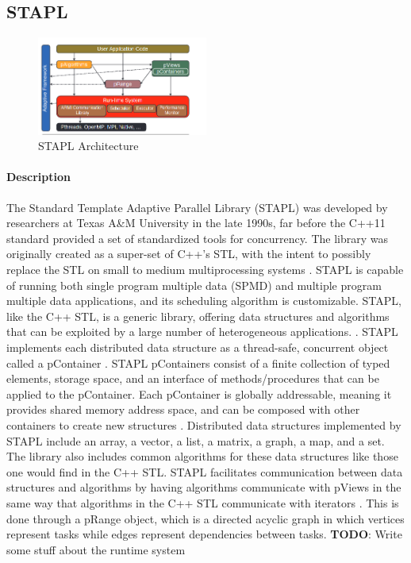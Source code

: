 \subsection{STAPL}
\begin{figure}[h]
\centering
\includegraphics[width=0.5\textwidth]{Figures/stapl_overview.png}
\caption{STAPL Architecture \cite{stapl_parallel_container}}
\label{fig:stapl_arch}
\end{figure}
\paragraph{Description} 
The Standard Template Adaptive Parallel Library (STAPL) was developed by researchers at Texas A\&M University in the late 1990s, far before the C++11 standard provided a set of standardized tools for concurrency. The library was originally created as a super-set of C++'s STL, with the intent to possibly replace the STL on small to medium multiprocessing systems \cite{STAPL}. STAPL is capable of running both single program multiple data (SPMD) and multiple program multiple data applications, and its scheduling algorithm is customizable. STAPL, like the C++ STL, is a generic library, offering data structures and algorithms that can be exploited by a large number of heterogeneous applications. \cite{STAPL}. STAPL implements each distributed data structure as a thread-safe, concurrent object called a pContainer \cite{stapl_parallel_container}. STAPL pContainers consist of a finite collection of typed elements, storage space, and an interface of methods/procedures that can be applied to the pContainer. \cite{stapl_parallel_container} Each pContainer is globally addressable, meaning it provides shared memory address space, and can be composed with other containers to create new structures \cite{stapl_parallel_container}. Distributed data structures implemented by STAPL include an array, a vector, a list, a matrix, a graph, a map, and a set. The library also includes common algorithms for these data structures like those one would find in the C++ STL. STAPL facilitates communication between data structures and algorithms by having algorithms communicate with pViews in the same way that algorithms in the C++ STL communicate with iterators \cite{stapl_parallel_container}. This is done through a pRange object, which is a directed acyclic graph in which vertices represent tasks while edges represent dependencies between tasks.
\textbf{TODO}:  Write some stuff about the runtime system
\cite{stapl_rts}


